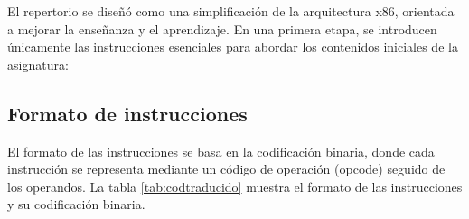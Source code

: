 \documentclass[12pt,oneside]{templates/unerthesis}
\begin{document}
El repertorio se diseñó como una simplificación de la arquitectura x86, orientada a mejorar la enseñanza y el aprendizaje. En una primera etapa, se introducen únicamente las instrucciones esenciales para abordar los contenidos iniciales de la asignatura:

\begin{table}[!h]
\centering
\caption{\label{tab:setreducido}Tabla de instrucciones de VonSim8}
\centering
{}
\end{table}

\hypertarget{formato-de-instrucciones}{%
\subsection{Formato de instrucciones}\label{formato-de-instrucciones}}

El formato de las instrucciones se basa en la codificación binaria, donde cada instrucción se representa mediante un código de operación (opcode) seguido de los operandos. La tabla \ref{tab:codtraducido} muestra el formato de las instrucciones y su codificación binaria.
\end{document}
